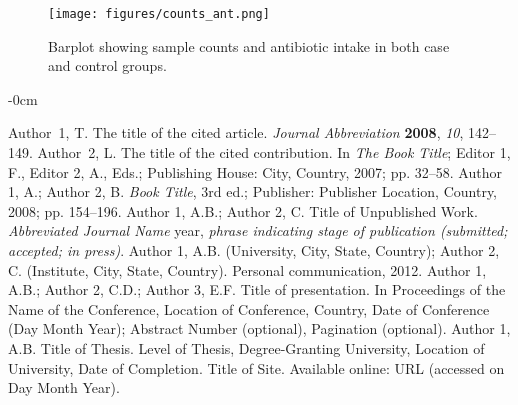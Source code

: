 \documentclass[biotech,article,submit,pdftex,moreauthors]{Definitions/mdpi}
\begin{document}
\begin{figure}[H]
	\centering
	\texttt{[image: figures/counts\_ant.png]}
	\caption{Barplot showing sample counts and antibiotic intake in both case and control groups.}
	\label{sfig:counts_ant}
\end{figure}

\begin{adjustwidth}{-\extralength}{0cm}



%

\begin{thebibliography}{999}
Author~1, T. The title of the cited article. {\em Journal Abbreviation} {\bf 2008}, {\em 10}, 142--149.
Author~2, L. The title of the cited contribution. In {\em The Book Title}; Editor 1, F., Editor 2, A., Eds.; Publishing House: City, Country, 2007; pp. 32--58.
Author 1, A.; Author 2, B. \textit{Book Title}, 3rd ed.; Publisher: Publisher Location, Country, 2008; pp. 154--196.
Author 1, A.B.; Author 2, C. Title of Unpublished Work. \textit{Abbreviated Journal Name} year, \textit{phrase indicating stage of publication (submitted; accepted; in press)}.
Author 1, A.B. (University, City, State, Country); Author 2, C. (Institute, City, State, Country). Personal communication, 2012.
Author 1, A.B.; Author 2, C.D.; Author 3, E.F. Title of presentation. In Proceedings of the Name of the Conference, Location of Conference, Country, Date of Conference (Day Month Year); Abstract Number (optional), Pagination (optional).
Author 1, A.B. Title of Thesis. Level of Thesis, Degree-Granting University, Location of University, Date of Completion.
Title of Site. Available online: URL (accessed on Day Month Year).
\end{thebibliography}


\end{adjustwidth}
\end{document}
